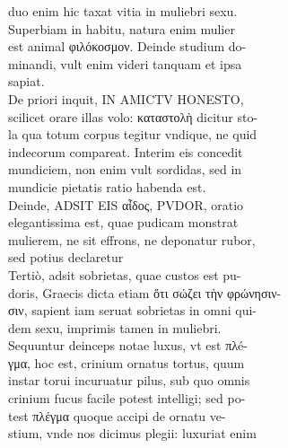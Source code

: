 \documentclass{article}
\begin{document}
\begin{pages}
                duo enim hic taxat vitia in muliebri sexu. \\
                Superbiam in habitu, natura enim mulier \\
                est animal φιλόκοσμον. Deinde studium do- \\
                minandi, vult enim videri tanquam et ipsa \\
                sapiat. \\
                De priori inquit, IN AMICTV HONESTO, \\
                scilicet orare illas volo: καταστολὴ dicitur sto- \\
                la qua totum corpus tegitur vndique, ne quid \\
                indecorum compareat. Interim eis concedit \\
                mundiciem, non enim vult sordidas, sed in \\
                mundicie pietatis ratio habenda est. \\
                Deinde, ADSIT EIS αἶδος, PVDOR, oratio \\
                elegantissima est, quae pudicam monstrat \\
                mulierem, ne sit effrons, ne deponatur rubor, \\
                sed potius declaretur \\
                Tertiò, adsit sobrietas, quae custos est pu- \\
                doris, Graecis dicta etiam ὅτι σώζει τὴν φρώνησιν- \\
                σιν, sapient iam seruat sobrietas in omni qui- \\
                dem sexu, imprimis tamen in muliebri. \\
                Sequuntur deinceps notae luxus, vt est πλé- \\
                γμα, hoc est, crinium ornatus tortus, quum \\
                instar torui incuruatur pilus, sub quo omnis \\
                crinium fucus facile potest intelligi; sed po- \\
                test πλέγμα quoque accipi de ornatu ve- \\
                stium, vnde nos dicimus plegii: luxuriat enim \\

\end{pages}
\end{document}
